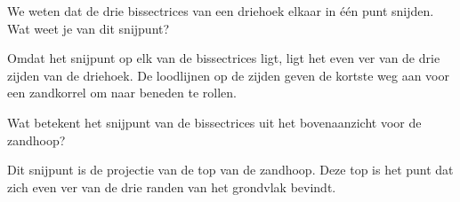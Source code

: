 \documentclass{ximera}
\begin{document}
\begin{exercise}
    We weten dat de drie bissectrices van een driehoek elkaar in \'e\'en punt snijden. Wat
    weet je van dit snijpunt?
    \begin{oplossing}
        Omdat het snijpunt op elk van de bissectrices ligt, ligt het even ver van de drie
        zijden van de driehoek. De loodlijnen op de zijden geven de kortste weg aan voor een
        zandkorrel om naar beneden te rollen.
    \end{oplossing}
\end{exercise}


\begin{exercise}
    Wat betekent het snijpunt van de bissectrices uit het bovenaanzicht voor de zandhoop?
    \begin{oplossing}
        Dit snijpunt is de projectie van de top van de zandhoop. Deze top is het punt dat
        zich even ver van de drie randen van het grondvlak bevindt.
    \end{oplossing}
\end{exercise}
\end{document}
